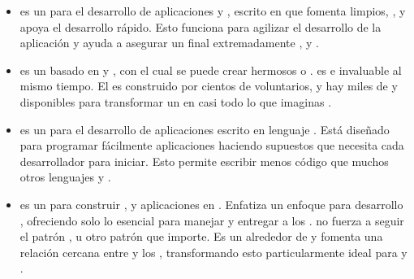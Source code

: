 \begin{itemize}
			\item
				\textbf{\yiiNAME} es un \frameworkPC para el desarrollo de aplicaciones \webINT \freePC y \openSourcePC, escrito en  que fomenta limpios, \dryDesignQA  \designQA, y apoya el desarrollo rápido. Esto funciona para agilizar el desarrollo de la aplicación y ayuda a asegurar un \itemCOM final extremadamente \efficientQA, \extensibleQA y \maintainableQA.
			\item
				\textbf{\wordPressNAME} es un \softwarePC \webINT basado en \phpNAME y \mysqlNAME, con el cual se puede crear hermosos \websiteINT o \blogINT. \wordPressNAME es \freePC e invaluable al mismo tiempo. 
				El \softwarePC \coreAS es construido por cientos de voluntarios, y hay miles de \pluginsAS y \themesCPT disponibles para transformar un \websiteINT en casi todo lo que imaginas \cite{online_wordPress_org}.

			\item
				\textbf{\rubyonrailsNAME} es un \frameworkPC para el desarrollo de aplicaciones \webINT escrito en lenguaje \rubyNAME. Está diseñado para programar fácilmente aplicaciones \webINT haciendo supuestos que necesita cada desarrollador para iniciar. Esto permite escribir menos código que muchos otros lenguajes y \frameworksPC \cite{online_technology_rubyonrails}.

			\item
				\textbf{\sinatraNAME} es un \domainSpecificLangPL para construir \websitesINT, \webServiceINT y aplicaciones \webINT en \rubyNAME. Enfatiza un enfoque para desarrollo \minimalisticQA, ofreciendo solo lo esencial para manejar \httpNAME \requestINT y entregar \responsesINT a los \clientsAS. \sinatraNAME no fuerza a seguir el patrón \modelViewConAS, u otro patrón que importe. Es un \wrapperAS \lightweightPL alrededor de \rackMiddleRubyAS y fomenta una relación cercana entre \serviceCPT \apiendpointsAS y los \httpVerbsAS, transformando esto particularmente ideal para \webServicesINT y \apisAS \cite{book_sinatra_oreilly}.


\end{itemize}
